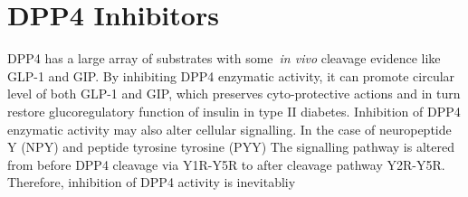 \section{DPP4 Inhibitors}
DPP4 has a large array of substrates with some~\textit{in vivo} cleavage evidence like GLP-1 and GIP. By inhibiting DPP4 enzymatic activity, it can promote circular level of both GLP-1 and GIP, which preserves cyto-protective actions and in turn restore glucoregulatory function of insulin in type II diabetes. Inhibition of DPP4 enzymatic activity may also alter cellular signalling. In the case of neuropeptide Y (NPY) and peptide tyrosine tyrosine (PYY) The signalling pathway is altered from before DPP4 cleavage via Y1R-Y5R to after cleavage pathway Y2R-Y5R.~\cite{Mulvihill_2014} Therefore, inhibition of DPP4 activity is inevitabliy  